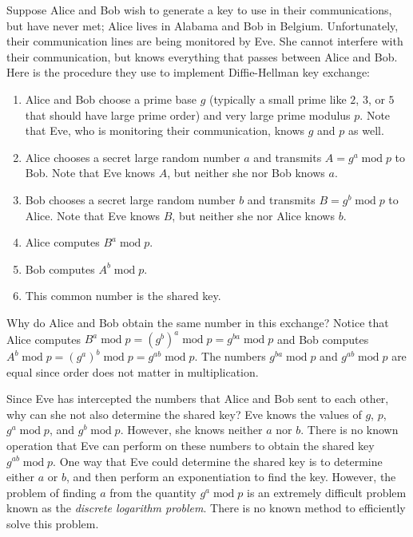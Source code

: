 \documentclass{book}
\theoremstyle{plain}
\theoremstyle{definition}
\renewcommand{\mod}{\operatorname{mod}}
\renewcommand{\mod}{\operatorname{mod}}
\begin{document}
Suppose Alice and Bob wish to generate a key to use in their communications, but have never met; Alice lives in Alabama and Bob in Belgium. Unfortunately, their communication lines are being monitored by Eve. She cannot interfere with their communication, but knows everything that passes between Alice and Bob. Here is the procedure they use to implement Diffie-Hellman key exchange:
\begin{enumerate}
\item Alice and Bob choose a prime base $g$ (typically a small prime like $2$, $3$, or $5$ that should have large prime order) and very large prime modulus $p$. Note that Eve, who is monitoring their communication, knows $g$ and $p$ as well.
\item Alice chooses a secret large random number $a$ and transmits $A = g^a \mod p$ to Bob. Note that Eve knows $A$, but neither she nor Bob knows $a$.
\item Bob chooses a secret large random number $b$ and transmits $B = g^b \mod p$ to Alice. Note that Eve knows $B$, but neither she nor Alice knows $b$.
\item Alice computes $B^a \mod p$.
\item Bob computes $A^b \mod p$.
\item This common number is the shared key.
\end{enumerate}

Why do Alice and Bob obtain the same number in this exchange? Notice that Alice computes $B^a \mod p = (g^b)^a \mod p = g^{ba} \mod p$ and Bob computes $A^b \mod p = (g^a)^b \mod p = g^{ab} \mod p$. The numbers $g^{ba} \mod p$ and $g^{ab} \mod p$ are equal since order does not matter in multiplication.

Since Eve has intercepted the numbers that Alice and Bob sent to each other, why can she not also determine the shared key? Eve knows the values of $g$, $p$, $g^a \mod p$, and $g^b \mod p$. However, she knows neither $a$ nor $b$. There is no known operation that Eve can perform on these numbers to obtain the shared key $g^{ab} \mod p$. One way that Eve could determine the shared key is to determine either $a$ or $b$, and then perform an exponentiation to find the key. However, the problem of finding $a$ from the quantity $g^a \mod p$ is an extremely difficult problem known as the {\it discrete logarithm problem}. There is no known method to efficiently solve this problem.
\end{document}
